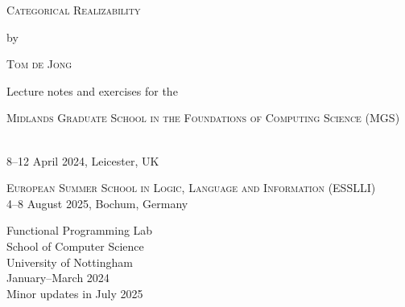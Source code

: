 \begin{titlepage}
\begin{center}

  \large %

  {\Huge\textsc{Categorical Realizability}\par}


  by


  {\huge\textsc{Tom de Jong}}


  {\Large{Lecture notes and exercises for the

      \textsc{Midlands Graduate School in the
Foundations of Computing Science (MGS)}}} \\
  8--12 April 2024, Leicester, UK

  {\Large{\textsc{European Summer School in Logic, Language and Information (ESSLLI)}}} \\
    4--8 August 2025, Bochum, Germany



  \makeicon

  \vfill

  \flushright
  {\normalsize{Functional Programming Lab\\
      School of Computer Science \\
      University of Nottingham \\
      January--March 2024}\\
  Minor updates in July 2025}

\end{center}
\end{titlepage}

